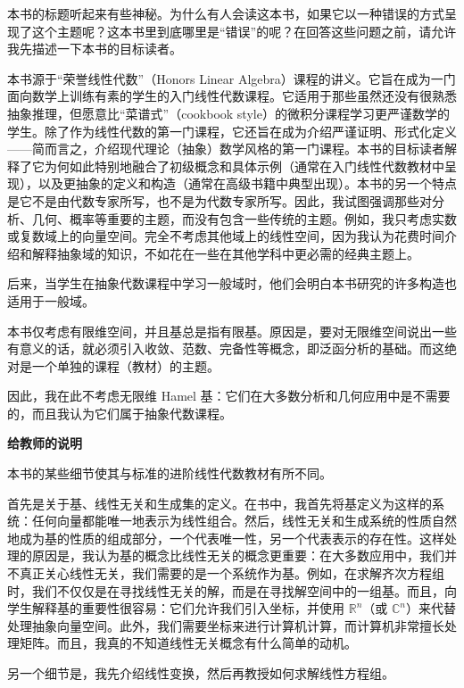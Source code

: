 

\begin{preface}
本书的标题听起来有些神秘。为什么有人会读这本书，如果它以一种错误的方式呈现了这个主题呢？这本书里到底哪里是“错误”的呢？在回答这些问题之前，请允许我先描述一下本书的目标读者。

本书源于“荣誉线性代数”（Honors Linear Algebra）课程的讲义。它旨在成为一门面向数学上训练有素的学生的入门线性代数课程。它适用于那些虽然还没有很熟悉抽象推理，但愿意比“菜谱式”（cookbook style）的微积分课程学习更严谨数学的学生。除了作为线性代数的第一门课程，它还旨在成为介绍严谨证明、形式化定义——简而言之，介绍现代理论（抽象）数学风格的第一门课程。本书的目标读者解释了它为何如此特别地融合了初级概念和具体示例（通常在入门线性代数教材中呈现），以及更抽象的定义和构造（通常在高级书籍中典型出现）。本书的另一个特点是它不是由代数专家所写，也不是为代数专家所写。因此，我试图强调那些对分析、几何、概率等重要的主题，而没有包含一些传统的主题。例如，我只考虑实数或复数域上的向量空间。完全不考虑其他域上的线性空间，因为我认为花费时间介绍和解释抽象域的知识，不如花在一些在其他学科中更必需的经典主题上。

后来，当学生在抽象代数课程中学习一般域时，他们会明白本书研究的许多构造也适用于一般域。

本书仅考虑有限维空间，并且基总是指有限基。原因是，要对无限维空间说出一些有意义的话，就必须引入收敛、范数、完备性等概念，即泛函分析的基础。而这绝对是一个单独的课程（教材）的主题。

因此，我在此不考虑无限维 Hamel 基：它们在大多数分析和几何应用中是不需要的，而且我认为它们属于抽象代数课程。

\textbf{给教师的说明}

本书的某些细节使其与标准的进阶线性代数教材有所不同。

首先是关于基、线性无关和生成集的定义。在书中，我首先将基定义为这样的系统：任何向量都能唯一地表示为线性组合。然后，线性无关和生成系统的性质自然地成为基的性质的组成部分，一个代表唯一性，另一个代表表示的存在性。这样处理的原因是，我认为基的概念比线性无关的概念更重要：在大多数应用中，我们并不真正关心线性无关，我们需要的是一个系统作为基。例如，在求解齐次方程组时，我们不仅仅是在寻找线性无关的解，而是在寻找解空间中的一组基。而且，向学生解释基的重要性很容易：它们允许我们引入坐标，并使用 $\mathbb{R}^n$（或 $\mathbb{C}^n$）来代替处理抽象向量空间。此外，我们需要坐标来进行计算机计算，而计算机非常擅长处理矩阵。而且，我真的不知道线性无关概念有什么简单的动机。

另一个细节是，我先介绍线性变换，然后再教授如何求解线性方程组。


\end{preface}
